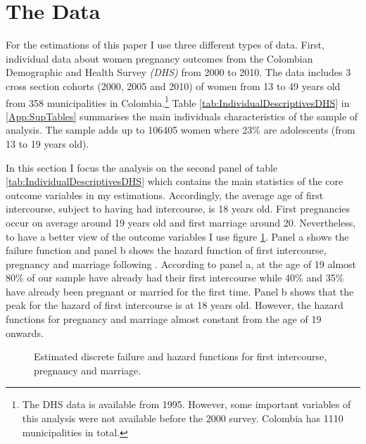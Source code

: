 \documentclass[a4paper,10pt,twocolumn,preprint,3p,authoryear]{elsarticle}
\begin{document}
\section{The Data\label{sec:Data}}

For the estimations of this paper I use three different types of data.  First, individual data about women pregnancy outcomes from the Colombian Demographic and Health Survey \emph{(DHS)} from 2000 to 2010.  The data includes 3 cross section cohorts (2000, 2005 and 2010) of women from 13 to 49 years old from 358 municipalities in Colombia.\footnote{The DHS data is available from 1995. However, some important variables of this analysis were not available before the 2000 survey. Colombia has 1110 municipalities in total.} Table \ref{tab:IndividualDescriptivesDHS} in \ref{App:SupTables} summarises the main individuals characteristics of the sample of analysis. The sample adds up to 106405 women where 23\% are adolescents (from 13 to 19 years old). 

In this section I focus the analysis on the second panel of table \ref{tab:IndividualDescriptivesDHS} which contains the main statistics of the core outcome variables in my estimations. Accordingly, the average age of first intercourse, subject to having had intercourse, is 18 years old. First pregnancies occur on average around 19 years old and first marriage around 20. Nevertheless, to have a better view of the outcome variables I use figure \ref{fig:DisSurDesByAll}. Panel a shows the failure function and panel b shows the hazard function of first intercourse, pregnancy and marriage following \citet{Jenkins2005}. According to panel a, at the age of 19 almost 80\% of our sample have  already had their first intercourse while 40\% and 35\% have already been pregnant or married for the first time. Panel b shows that the peak for the hazard of first intercourse is at 18 years old. However, the hazard functions for pregnancy and marriage almost constant from the age of 19 onwards.

\begin{figure}[h]
  \centering
  \begin{minipage}[t]{1\columnwidth}%
		  \begin{spacing}{1}
		  \end{spacing}
	  \end{minipage}
  \caption{Estimated discrete failure and hazard functions for first intercourse, pregnancy and marriage.}
  \label{fig:DisSurDesByAll}
\end{figure}
\end{document}
